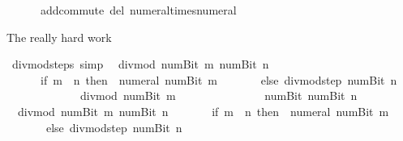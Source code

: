 \begin{isabellebody}
\ \ \ \ \ \ add{\isachardot}{\kern0pt}commute\ del{\isacharcolon}{\kern0pt}\ numeral{\isacharunderscore}{\kern0pt}times{\isacharunderscore}{\kern0pt}numeral{\isacharparenright}{\kern0pt}\isanewline
{}\isamarkupfalse%
%
\endisatagproof
{\isafoldproof}%
%
\isadelimproof
%
\endisadelimproof
%
\begin{isamarkuptext}%
The really hard work%
\end{isamarkuptext}\isamarkuptrue%
\isamarkupfalse%
\ divmod{\isacharunderscore}{\kern0pt}steps\ {\isacharbrackleft}{\kern0pt}simp{\isacharbrackright}{\kern0pt}{\isacharcolon}{\kern0pt}\isanewline
\ \ {\isachardoublequoteopen}divmod\ {\isacharparenleft}{\kern0pt}num{\isachardot}{\kern0pt}Bit{}\ m{\isacharparenright}{\kern0pt}\ {\isacharparenleft}{\kern0pt}num{\isachardot}{\kern0pt}Bit{}\ n{\isacharparenright}{\kern0pt}\ {\isacharequal}{\kern0pt}\isanewline
\ \ \ \ \ \ {\isacharparenleft}{\kern0pt}if\ m\ {\isasymle}\ n\ then\ {\isacharparenleft}{\kern0pt}{}{\isacharcomma}{\kern0pt}\ numeral\ {\isacharparenleft}{\kern0pt}num{\isachardot}{\kern0pt}Bit{}\ m{\isacharparenright}{\kern0pt}{\isacharparenright}{\kern0pt}\isanewline
\ \ \ \ \ \ \ else\ divmod{\isacharunderscore}{\kern0pt}step\ {\isacharparenleft}{\kern0pt}num{\isachardot}{\kern0pt}Bit{}\ n{\isacharparenright}{\kern0pt}\isanewline
\ \ \ \ \ \ \ \ \ \ \ \ \ {\isacharparenleft}{\kern0pt}divmod\ {\isacharparenleft}{\kern0pt}num{\isachardot}{\kern0pt}Bit{}\ m{\isacharparenright}{\kern0pt}\isanewline
\ \ \ \ \ \ \ \ \ \ \ \ \ \ \ {\isacharparenleft}{\kern0pt}num{\isachardot}{\kern0pt}Bit{}\ {\isacharparenleft}{\kern0pt}num{\isachardot}{\kern0pt}Bit{}\ n{\isacharparenright}{\kern0pt}{\isacharparenright}{\kern0pt}{\isacharparenright}{\kern0pt}{\isacharparenright}{\kern0pt}{\isachardoublequoteclose}\isanewline
\ \ {\isachardoublequoteopen}divmod\ {\isacharparenleft}{\kern0pt}num{\isachardot}{\kern0pt}Bit{}\ m{\isacharparenright}{\kern0pt}\ {\isacharparenleft}{\kern0pt}num{\isachardot}{\kern0pt}Bit{}\ n{\isacharparenright}{\kern0pt}\ {\isacharequal}{\kern0pt}\isanewline
\ \ \ \ \ \ {\isacharparenleft}{\kern0pt}if\ m\ {\isacharless}{\kern0pt}\ n\ then\ {\isacharparenleft}{\kern0pt}{}{\isacharcomma}{\kern0pt}\ numeral\ {\isacharparenleft}{\kern0pt}num{\isachardot}{\kern0pt}Bit{}\ m{\isacharparenright}{\kern0pt}{\isacharparenright}{\kern0pt}\isanewline
\ \ \ \ \ \ \ else\ divmod{\isacharunderscore}{\kern0pt}step\ {\isacharparenleft}{\kern0pt}num{\isachardot}{\kern0pt}Bit{}\ n{\isacharparenright}{\kern0pt}\isanewline

\end{isabellebody}
